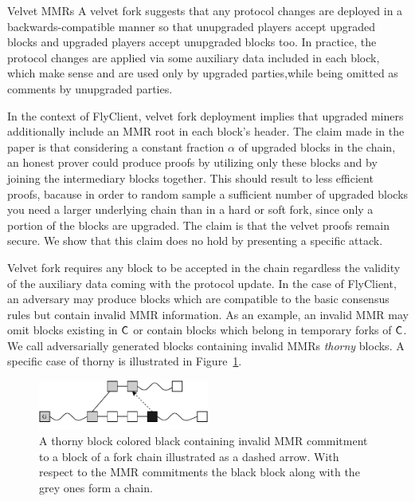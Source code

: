 \begin{section}{Velvet MMRs}
	A velvet fork suggests that any protocol changes are deployed in a backwards-compatible manner so that unupgraded players accept upgraded blocks and upgraded players accept unupgraded blocks too. In practice, the protocol changes are applied via some auxiliary data included in each block, which make sense and are used only by upgraded parties,while being omitted as comments by unupgraded parties. 

	In the context of FlyClient, velvet fork deployment implies that upgraded miners additionally include an MMR root in each block's header. The claim made in the paper is that considering a constant fraction $\alpha$ of upgraded blocks in the chain, an honest prover could produce proofs by utilizing only these blocks and by joining the intermediary blocks together. This should result to less efficient proofs, bacause in order to random sample a sufficient number of upgraded blocks you need a larger underlying chain than in a hard or soft fork, since only a portion of the blocks are upgraded. The claim is that the velvet proofs remain secure. We show that this claim does no hold by presenting a specific attack.
	
	Velvet fork requires any block to be accepted in the chain regardless the validity of the auxiliary data coming with the protocol update. In the case of FlyClient, an adversary may produce blocks which are compatible to the basic consensus rules but contain invalid MMR information. As an example, an invalid MMR may omit blocks existing in $\mathsf{C}$ or contain blocks which belong in temporary forks of $\mathsf{C}$.  We call adversarially generated blocks containing invalid MMRs \emph{thorny} blocks. A specific case of thorny is illustrated in Figure~\ref{fig:thorny_flyclient}.

	\begin{figure}[h!]
		\begin{center}
			\includegraphics[width=0.5\textwidth]{figures/thorny_flyclient.pdf}
		\end{center}
		\caption{A thorny block colored black containing invalid MMR commitment to a block of a fork chain illustrated as a dashed arrow. With respect to the MMR commitments the black block along with the grey ones form a chain.}
		\label{fig:thorny_flyclient}
	\end{figure}
	
\end{section}

